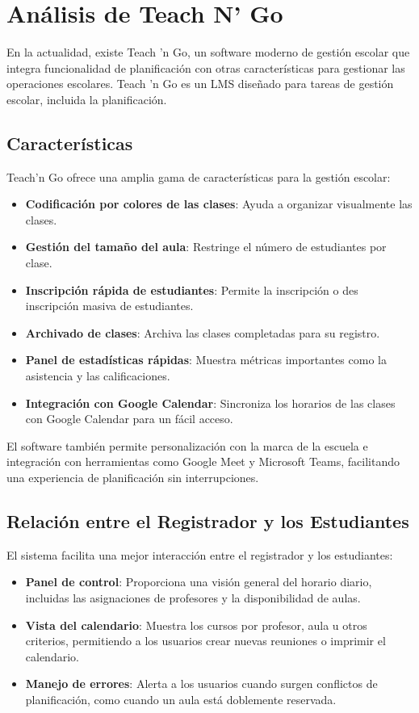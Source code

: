 \section{Análisis de Teach N' Go}
\label{sec:teachNGo}

En la actualidad, existe Teach 'n Go, un software moderno de gestión escolar que integra funcionalidad de planificación con otras características para gestionar las operaciones escolares.
Teach 'n Go es un LMS  diseñado para tareas de gestión escolar, incluida la planificación.
\subsection*{Características}
Teach'n Go ofrece una amplia gama de características para la gestión escolar:
\begin{itemize}
    \item \textbf{Codificación por colores de las clases}: Ayuda a organizar visualmente las clases.
    \item \textbf{Gestión del tamaño del aula}: Restringe el número de estudiantes por clase.
    \item \textbf{Inscripción rápida de estudiantes}: Permite la inscripción o des inscripción masiva de estudiantes.
    \item \textbf{Archivado de clases}: Archiva las clases completadas para su registro.
    \item \textbf{Panel de estadísticas rápidas}: Muestra métricas importantes como la asistencia y las calificaciones.
    \item \textbf{Integración con Google Calendar}: Sincroniza los horarios de las clases con Google Calendar para un fácil acceso.
\end{itemize}

El software también permite personalización con la marca de la escuela e integración con herramientas como Google Meet y Microsoft Teams, facilitando una experiencia de planificación sin interrupciones.

\subsection*{Relación entre el Registrador y los Estudiantes}
El sistema facilita una mejor interacción entre el registrador y los estudiantes:
\begin{itemize}
    \item \textbf{Panel de control}: Proporciona una visión general del horario diario, incluidas las asignaciones de profesores y la disponibilidad de aulas.
    \item \textbf{Vista del calendario}: Muestra los cursos por profesor, aula u otros criterios, permitiendo a los usuarios crear nuevas reuniones o imprimir el calendario.
    \item \textbf{Manejo de errores}: Alerta a los usuarios cuando surgen conflictos de planificación, como cuando un aula está doblemente reservada.
\end{itemize}

